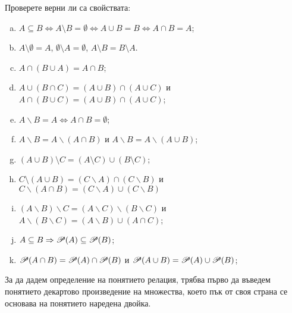 \begin{problem}
  Проверете верни ли са свойствата:
  \begin{enumerate}[a)]
  \item
    $A\subseteq B \iff A\setminus B = \emptyset \iff A\cup B = B \iff A\cap B = A$;
  \item
    $A\setminus \emptyset = A$, $\emptyset\setminus A=\emptyset$, $A\setminus B = B\setminus A$.
  \item
    $A\cap (B\cup A) = A \cap B$;
  \item
    $A\cup(B\cap C) = (A\cup B)\cap(A\cup C)$ и $A \cap (B \cup C) = (A \cup B) \cap (A \cup C)$;
  \item
    $A\backslash B = A \iff A\cap B = \emptyset$;
  \item
    $A\backslash B = A\backslash (A\cap B)$ и $A\backslash B = A\backslash (A\cup B)$;
  \item
    $(A\cup B)\setminus C = (A\setminus C) \cup (B\setminus C)$;
  \item
    $C\setminus (A\cup B) = (C\backslash A)\cap(C\backslash B)$ и $C \backslash (A\cap B) = (C\backslash A)\cup(C\backslash B)$
  \item
    $(A\backslash B)\backslash C = (A\backslash C)\backslash(B \backslash C)$ и $A\backslash (B\backslash C) = (A\backslash B) \cup (A\cap C)$;
  \item
    $A\subseteq B \Rightarrow \mathscr{P}(A) \subseteq \mathscr{P}(B)$;
  \item
    $\mathscr{P}(A\cap B) = \mathscr{P}(A) \cap \mathscr{P}(B)$ и $\mathscr{P}(A\cup B) = \mathscr{P}(A) \cup \mathscr{P}(B)$;
  \end{enumerate}
\end{problem}

За да дадем определение на понятието релация, трябва първо 
да въведем понятието декартово произведение на множества,
което пък от своя страна се основава на понятието наредена двойка.

